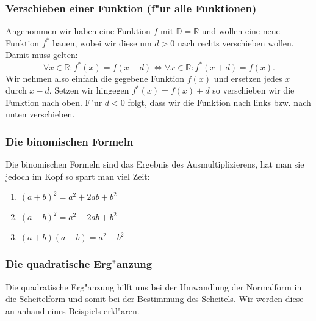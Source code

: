 \subsubsection{Verschieben einer Funktion (f"ur alle Funktionen)} \label{sec:verschieben}
Angenommen wir haben eine Funktion $f$ mit $\mathbb{D} = \mathbb{R}$ und wollen eine neue Funktion $f^*$ bauen, wobei wir diese um $d > 0$ nach rechts verschieben wollen. Damit muss gelten:
\begin{equation*}
\forall x \in \mathbb{R} :  f^*(x) = f(x-d) \iff \forall x \in \mathbb{R} : f^*(x+d) = f(x).
\end{equation*}
Wir nehmen also einfach die gegebene Funktion $f(x)$ und ersetzen jedes $x$ durch $x-d$. Setzen wir hingegen $f^*(x) = f(x) + d$ so verschieben wir die Funktion nach oben. F"ur $d < 0$ folgt, dass wir die Funktion nach links bzw. nach unten verschieben.

\subsubsection{Die binomischen Formeln}
Die binomischen Formeln sind das Ergebnis des Ausmultiplizierens, hat man sie jedoch im Kopf so spart man viel Zeit:
\begin{enumerate}
\item $(a+b)^2=a^2+2ab+b^2$
\item $(a-b)^2=a^2-2ab+b^2$
\item $(a+b)(a-b)=a^2-b^2$
\end{enumerate}

\subsubsection{Die quadratische Erg"anzung}
Die quadratische Erg"anzung hilft uns bei der Umwandlung der Normalform in die Scheitelform und somit bei der Bestimmung des Scheitels. Wir werden diese an anhand eines Beispiels erkl"aren.

